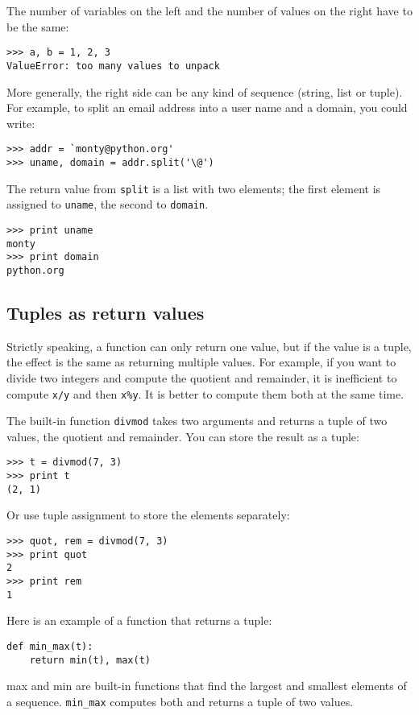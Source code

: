 \documentclass{article}
\begin{document}
The number of variables on the left and the number of values on the
right have to be the same:
\begin{verbatim}
>>> a, b = 1, 2, 3
ValueError: too many values to unpack
\end{verbatim}
More generally, the right side can be any kind of sequence (string,
list or tuple). For example, to split an email address into a user
name and a domain, you could write:
\begin{verbatim}
>>> addr = `monty@python.org'
>>> uname, domain = addr.split('\@')
\end{verbatim}
The return value from \verb|split| is a list with two elements;
the first element is assigned to \verb|uname|, the second to
\verb|domain|.
\begin{verbatim}
>>> print uname
monty
>>> print domain
python.org
\end{verbatim}

\subsection{Tuples as return values}
Strictly speaking, a function can only return one value, but if the
value is a tuple, the effect is the same as returning multiple values.
For example, if you want to divide two integers and compute the
quotient and remainder, it is inefficient to compute \verb|x/y|
and then \verb|x%y|.
It is better to compute them both at the same time.

The built-in function \verb|divmod| takes two arguments and returns a tuple
of two values, the quotient and remainder. You can store the result as
a tuple:
\begin{verbatim}
>>> t = divmod(7, 3)
>>> print t
(2, 1)
\end{verbatim}
Or use tuple assignment to store the elements separately:
\begin{verbatim}
>>> quot, rem = divmod(7, 3)
>>> print quot
2
>>> print rem
1
\end{verbatim}
Here is an example of a function that returns a tuple:
\begin{verbatim}
def min_max(t):
    return min(t), max(t)
\end{verbatim}
    max and min are built-in functions that find the largest and
    smallest elements of a sequence.
    \verb|min_max| computes both and returns
    a tuple of two values.
\end{document}
